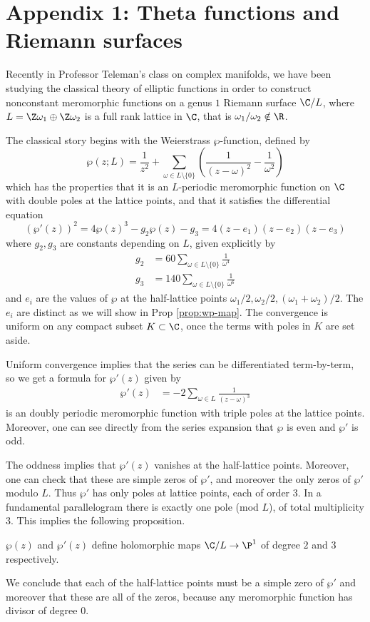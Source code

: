 \documentclass[12pt]{article}
\begin{document}
\section{Appendix 1: Theta functions and Riemann surfaces}
Recently in Professor Teleman's class on complex manifolds, we have been studying the classical theory of elliptic functions in order to construct nonconstant meromorphic functions on a genus $1$ Riemann surface $\C/L$, where $L = \Z \omega_1 \oplus \Z \omega_2$ is a full rank lattice in $\C$, that is $\omega_1/\omega_2 \notin \R$.

The classical story begins with the Weierstrass $\wp$-function, defined by
\[\wp(z;L) = \frac{1}{z^2} + \sum_{\omega \in L\setminus\{0\}} \left(\frac{1}{(z-\omega)^2} - \frac{1}{\omega^2}\right)\]
which has the properties that it is an $L$-periodic meromorphic function on $\C$ with double poles at the lattice points, and that it satisfies the differential equation
\[(\wp'(z))^2 = 4\wp(z)^3 - g_2\wp(z) - g_3 = 4(z - e_1)(z - e_2)(z - e_3)\]
where $g_2,g_3$ are constants depending on $L$, given explicitly by \begin{align*}
    g_2 & = 60\sum_{\omega \in L\setminus\{0\}} \frac{1}{\omega^4}  \\
    g_3 & = 140\sum_{\omega \in L\setminus\{0\}} \frac{1}{\omega^6}
\end{align*} and $e_i$ are the values of $\wp$ at the half-lattice points $\omega_1/2, \omega_2/2, (\omega_1+\omega_2)/2$. The $e_i$ are distinct as we will show in Prop \ref{prop:wp-map}.
The convergence is uniform on any compact subset $K \subset \C$, once the terms with poles in $K$ are set aside.

Uniform convergence implies that the series can be differentiated term-by-term, so we get a formula for $\wp'(z)$ given by \begin{align*}
    \wp'(z) & = -2\sum_{\omega \in L} \frac{1}{(z-\omega)^3}
\end{align*} is an doubly periodic meromorphic function with triple poles at the lattice points. Moreover, one can see directly from the series expansion that $\wp$ is even and $\wp'$ is odd.

The oddness implies that $\wp'(z)$ vanishes at the half-lattice points. Moreover, one can check that these are simple zeros of $\wp'$, and moreover the only zeros of $\wp'$ modulo $L$. Thus $\wp'$ has only poles at lattice points, each of order 3. In a fundamental parallelogram there is exactly one pole (mod $L$), of total multiplicity 3. This implies the following proposition.
\begin{proposition}
    $\wp(z)$ and $\wp'(z)$ define holomorphic maps $\C/L \to \P^1$ of degree $2$ and $3$ respectively.
\end{proposition}
We conclude that each of the half-lattice points must be a simple zero of $\wp'$ and moreover that these are all of the zeros, because any meromorphic function has divisor of degree 0.
\end{document}
